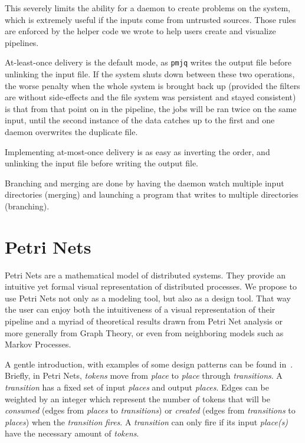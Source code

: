 \documentclass[letterpaper,twocolumn,10pt]{article}
\begin{document}
This severely limits the ability for a daemon to create problems on the system, which is extremely useful if the inputs come from untrusted sources. Those rules are enforced by the helper code we wrote to help users create and visualize pipelines.

At-least-once delivery is the default mode, as {\tt pmjq} writes the output file before unlinking the input file. If the system shuts down between these two operations, the worse penalty when the whole system is brought back up (provided the filters are without side-effects and the file system was persistent and stayed consistent) is that from that point on in the pipeline, the jobs will be ran twice on the same input, until the second instance of the data catches up to the first and one daemon overwrites the duplicate file.

Implementing at-most-once delivery is as easy as inverting the order, and unlinking the input file before writing the output file.

Branching and merging are done by having the daemon watch multiple input directories (merging) and launching a program that writes to multiple directories (branching).

\section{Petri Nets}

Petri Nets are a mathematical model of distributed systems. They provide an intuitive yet formal visual representation of distributed processes. We propose to use Petri Nets not only as a modeling tool, but also as a design tool. That way the user can enjoy both the intuitiveness of a visual representation of their pipeline and a myriad of theoretical results drawn from Petri Net analysis or more generally from Graph Theory, or even from neighboring models such as Markov Processes.

A gentle introduction, with examples of some design patterns can be found in~\cite{petrinetsintro}. Briefly, in Petri Nets, \emph{tokens} move from \emph{place} to \emph{place} through \emph{transitions}. A \emph{transition} has a fixed set of input \emph{places} and output \emph{places}. Edges can be weighted by an integer which represent the number of tokens that will be \emph{consumed} (edges from \emph{places} to \emph{transitions}) or \emph{created} (edges from \emph{transitions} to \emph{places}) when the \emph{transition} \emph{fires}. A \emph{transition} can only fire if its input \emph{place(s)} have the necessary amount of \emph{tokens}.
\end{document}
